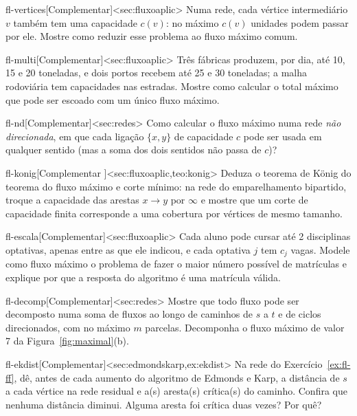 \begin{exercicio}{fl-vertices}[Complementar]<sec:fluxoaplic>
Numa rede, cada vértice intermediário $v$ também tem uma capacidade $c(v)$: no máximo $c(v)$ unidades podem passar por ele. Mostre como reduzir esse problema ao fluxo máximo comum.
\end{exercicio}
\begin{exercicio}{fl-multi}[Complementar]<sec:fluxoaplic>
Três fábricas produzem, por dia, até 10, 15 e 20 toneladas, e dois portos recebem até 25 e 30 toneladas; a malha rodoviária tem capacidades nas estradas. Mostre como calcular o total máximo que pode ser escoado com um único fluxo máximo.
\end{exercicio}
\begin{exercicio}{fl-nd}[Complementar]<sec:redes>
Como calcular o fluxo máximo numa rede \emph{não direcionada}, em que cada ligação $\{x,y\}$ de capacidade $c$ pode ser usada em qualquer sentido (mas a soma dos dois sentidos não passa de $c$)?
\end{exercicio}
\begin{exercicio}{fl-konig}[Complementar \estrela]<sec:fluxoaplic,teo:konig>
Deduza o teorema de König do teorema do fluxo máximo e corte mínimo: na rede do emparelhamento bipartido, troque a capacidade das arestas $x\to y$ por $\infty$ e mostre que um corte de capacidade finita corresponde a uma cobertura por vértices de mesmo tamanho.
\end{exercicio}
\begin{exercicio}{fl-escala}[Complementar]<sec:fluxoaplic>
Cada aluno pode cursar até 2 disciplinas optativas, apenas entre as que ele indicou, e cada optativa $j$ tem $c_j$ vagas. Modele como fluxo máximo o problema de fazer o maior número possível de matrículas e explique por que a resposta do algoritmo é uma matrícula válida.
\end{exercicio}
\begin{exercicio}{fl-decomp}[Complementar]<sec:redes>
Mostre que todo fluxo pode ser decomposto numa soma de fluxos ao longo de caminhos de $s$ a $t$ e de ciclos direcionados, com no máximo $m$ parcelas. Decomponha o fluxo máximo de valor 7 da Figura~\ref{fig:maximal}(b).
\end{exercicio}
\begin{exercicio}{fl-ekdist}[Complementar]<sec:edmondskarp,ex:ekdist>
Na rede do Exercício~\ref{ex:fl-ff}, dê, antes de cada aumento do algoritmo de Edmonds e Karp, a distância de $s$ a cada vértice na rede residual e a(s) aresta(s) crítica(s) do caminho. Confira que nenhuma distância diminui. Alguma aresta foi crítica duas vezes? Por quê?
\end{exercicio}
